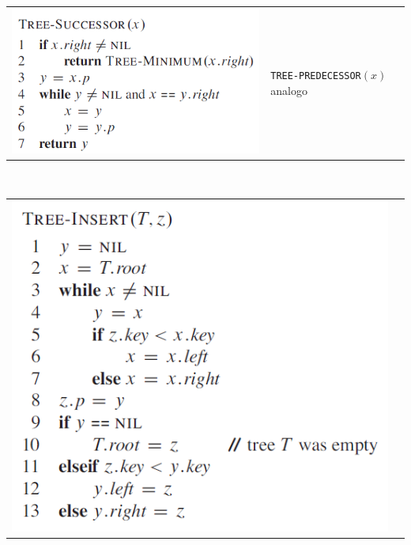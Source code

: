 \documentclass[11pt,a4paper]{article}
\begin{document}
\begin{tabular}{l l}
\includegraphics[scale=0.4]{img/tree6.png} & \texttt{TREE-PREDECESSOR}$(x)$ analogo
\end{tabular}
\medskip\\
\begin{tabular}{l l}
\includegraphics[scale=0.4]{img/tree7.png} \\

\end{tabular}
\end{document}
